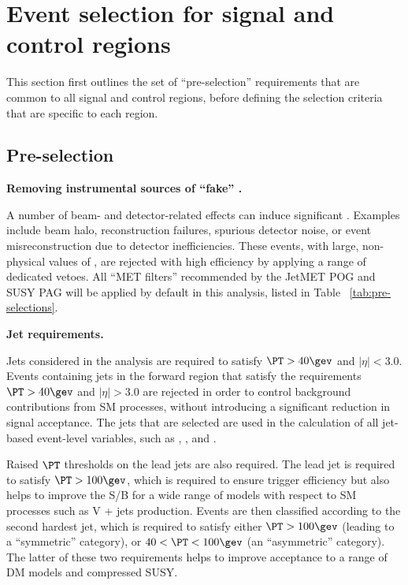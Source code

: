 \section{Event selection for signal and control regions}
\label{sec:selection}

This section first outlines the set of ``pre-selection'' requirements
that are common to all signal and control regions, before defining the
selection criteria that are specific to each region.

\subsection{Pre-selection}
\label{sec:preSelection}

{\bf Removing instrumental sources of ``fake'' \met.} 

A number of beam- and detector-related effects can induce significant
\met. Examples include beam halo, reconstruction failures, spurious
detector noise, or event misreconstruction due to detector
inefficiencies. These events, with large, non-physical values of \met,
are rejected with high efficiency by applying a range of dedicated
vetoes. All ``MET filters'' recommended by the JetMET POG and SUSY PAG
will be applied by default in this analysis, listed in Table ~\ref{tab:pre-selections}.

{\bf Jet requirements.} 

Jets considered in the analysis are required to satisfy $\PT>40\gev$
and $|\eta|<3.0$. Events containing jets in the forward region that
satisfy the requirements $\PT>40\gev$ and $|\eta|>3.0$ are rejected in
order to control background contributions from SM processes, without
introducing a significant reduction in signal acceptance. The jets
that are selected are used in the calculation of all jet-based
event-level variables, such as \HT, \mht, and \alphat.

Raised $\PT$ thresholds on the lead jets are also required. The lead
jet is required to satisfy $\PT > 100\gev$, which is required to
ensure trigger efficiency but also helps to improve the S/B for a wide
range of models with respect to SM processes such as V + jets
production. Events are then classified according to the second hardest
jet, which is required to satisfy either $\PT > 100\gev$ (leading to a
``symmetric'' \njet category), or $40 < \PT < 100\gev$ (an
``asymmetric'' \njet category). The latter of these two requirements
helps to improve acceptance to a range of DM models and compressed
SUSY.

